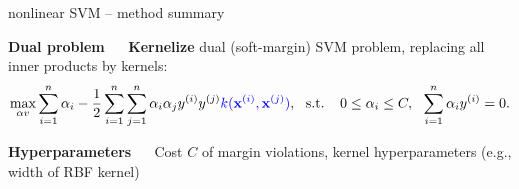 \documentclass[11pt,compress,t,notes=noshow, xcolor=table]{beamer}
\newcommand{\highlight}[1]{\textcolor{hlcol}{\textbf{#1}}}
\begin{document}
\begin{vbframe}{nonlinear SVM -- method summary}
  \framebreak

  \footnotesize

\highlight{Dual problem} ~~ \textbf{Kernelize} dual (soft-margin) SVM problem, 
replacing all inner products by kernels:
$$\max_{\alpha v} \sumin \alpha_i - \frac{1}{2}\sumin \sumjn
\alpha_i\alpha_j\yi y^{(j)} \textcolor{blue}{k(\xi, \xi[j])}, ~~ \text{s.t. } ~~ 
0 \le \alpha_i \le C, ~~ \sumin \alpha_i \yi = 0.
$$

\medskip

\highlight{Hyperparameters} ~~ Cost $C$ of margin violations, kernel 
hyperparameters (e.g., width of RBF kernel)

\medskip

\begin{columns}[T, totalwidth=\textwidth]
    \begin{column}{0.59\textwidth}
        

\end{column}
\end{columns}
\end{vbframe}
\end{document}
